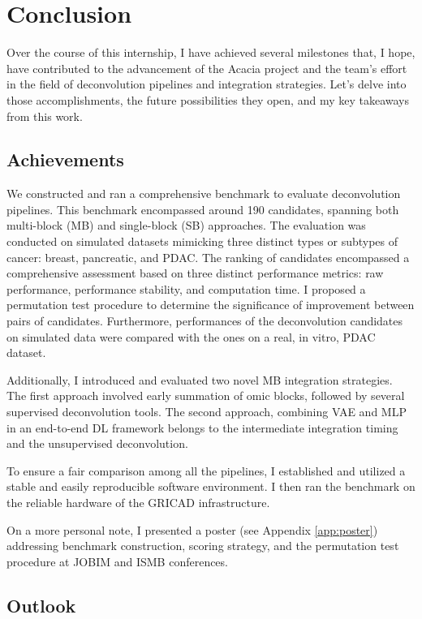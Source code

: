 \documentclass{article}
\begin{document}
\section{Conclusion}\label{sec:conclusion}

Over the course of this internship, I have achieved several milestones that, I hope, have contributed to the advancement of the Acacia project and the team's effort in the field of deconvolution pipelines and integration strategies.
Let's delve into those accomplishments, the future possibilities they open, and my key takeaways from this work.

\subsection{Achievements}\label{subsec:achievements}

We constructed and ran a comprehensive benchmark to evaluate deconvolution pipelines.
This benchmark encompassed around 190 candidates, spanning both multi-block (MB) and single-block (SB) approaches.
The evaluation was conducted on simulated datasets mimicking three distinct types or subtypes of cancer: breast, pancreatic, and PDAC.
The ranking of candidates encompassed a comprehensive assessment based on three distinct performance metrics: raw performance, performance stability, and computation time.
I proposed a permutation test procedure to determine the significance of improvement between pairs of candidates.
Furthermore, performances of the deconvolution candidates on simulated data were compared with the ones on a real, in vitro, PDAC dataset.

Additionally, I introduced and evaluated two novel MB integration strategies.
The first approach involved early summation of omic blocks, followed by several supervised deconvolution tools.
The second approach, combining VAE and MLP in an end-to-end DL framework belongs to the intermediate integration timing and the unsupervised deconvolution.

To ensure a fair comparison among all the pipelines, I established and utilized a stable and easily reproducible software environment. 
I then ran the benchmark on the reliable hardware of the GRICAD infrastructure.

On a more personal note, I presented a poster (see Appendix \ref{app:poster}) addressing benchmark construction, scoring strategy, and the permutation test procedure at JOBIM and ISMB conferences.

\subsection{Outlook}\label{subsec:outlook}
\end{document}
